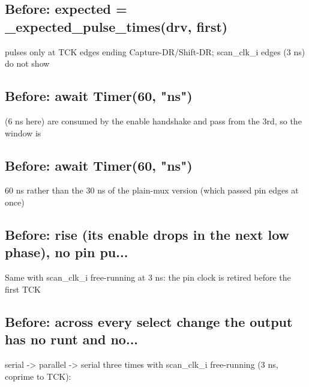 \begin{record}

\subsection*{Before: expected = \_expected\_pulse\_times(drv, first)}

\begin{textblock}
pulses only at TCK edges ending Capture-DR/Shift-DR; scan_clk_i edges (3 ns) do not show
\end{textblock}

\subsection*{Before: await Timer(60, "ns")}

\begin{textblock}
(6 ns here) are consumed by the enable handshake and pass from the 3rd, so the window is
\end{textblock}

\subsection*{Before: await Timer(60, "ns")}

\begin{textblock}
60 ns rather than the 30 ns of the plain-mux version (which passed pin edges at once)
\end{textblock}

\subsection*{Before: rise (its enable drops in the next low phase), no pin pu...}

\begin{textblock}
Same with scan_clk_i free-running at 3 ns: the pin clock is retired before the first TCK
\end{textblock}

\subsection*{Before: across every select change the output has no runt and no...}

\begin{textblock}
serial -> parallel -> serial three times with scan_clk_i free-running (3 ns, coprime to TCK):
\end{textblock}

\end{record}

